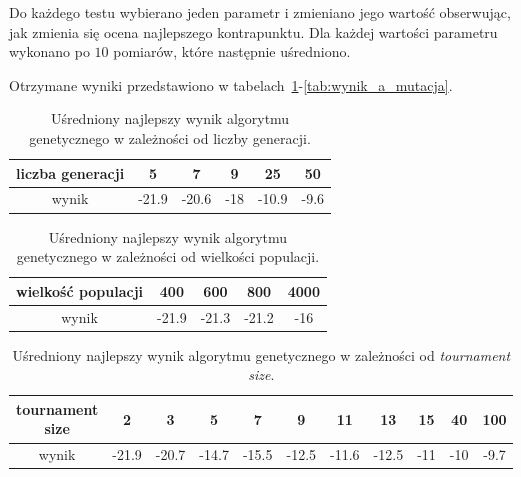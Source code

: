 \documentclass{article}
\begin{document}
Do każdego testu wybierano jeden parametr i zmieniano jego wartość obserwując, jak zmienia się ocena najlepszego kontrapunktu. Dla każdej wartości parametru wykonano po $10$ pomiarów, które następnie uśredniono.

Otrzymane wyniki przedstawiono w tabelach~\ref{tab:wynik_a_liczba_generacji}-\ref{tab:wynik_a_mutacja}.

\begin{table}
\begin{center}
  \begin{tabular}{ | c || c | c | c | c | c | }
    \hline
	liczba generacji & 5 & 7 & 9 & 25 & 50 \\ \hline
	wynik & -21.9 & -20.6 & -18 & -10.9 & -9.6 \\ \hline
  \end{tabular}
  \caption{Uśredniony najlepszy wynik algorytmu genetycznego w zależności od liczby generacji.}
  \label{tab:wynik_a_liczba_generacji}
  \end{center}
\end{table}

\begin{table}
\begin{center}
  \begin{tabular}{ | c || c | c | c | c | }
    \hline
	wielkość populacji & 400 & 600 & 800 & 4000 \\ \hline
	wynik & -21.9 & -21.3 & -21.2 & -16 \\ \hline
  \end{tabular}
  \caption{Uśredniony najlepszy wynik algorytmu genetycznego w zależności od wielkości populacji.}
  \label{tab:wynik_a_wielkosc_populacji}
  \end{center}
\end{table}

\begin{table}
\begin{center}
  \begin{tabular}{ | c || c | c | c | c | c | c | c | c | c | c |}
    \hline
	tournament size & 2 & 3 & 5 & 7 & 9 & 11 & 13 & 15 & 40 & 100 \\ \hline
	wynik & -21.9 & -20.7 & -14.7 & -15.5 & -12.5 & -11.6 & -12.5 & -11 & -10 & -9.7 \\ \hline
  \end{tabular}
  \caption{Uśredniony najlepszy wynik algorytmu genetycznego w zależności od \emph{tournament size}.}
  \label{tab:wynik_a_tournament_size}
  \end{center}
\end{table}
\end{document}
